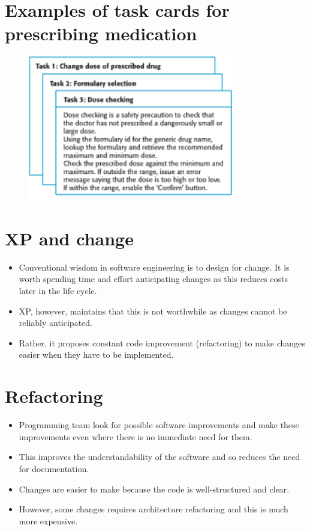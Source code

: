\section{ Examples of task cards for prescribing medication}
\begin{figure}[h!]
    \centering
    \includegraphics[width = 0.8\textwidth]{./figures/L2_5.png}
    \caption{}
    \label{fig:L2_5}
\end{figure}

\section{ XP and change}
\begin{itemize}
\item Conventional wisdom in software engineering is to design for change. It is worth spending time and effort anticipating changes as this reduces costs later in the life cycle.

\item XP, however, maintains that this is not worthwhile as changes cannot be reliably anticipated.
\item Rather, it proposes constant code improvement (refactoring) to make changes easier when they have to be implemented.
\end{itemize}

\section{ Refactoring}
\begin{itemize}

\item Programming team look for possible software improvements and make these improvements even where there is no immediate need for them.

\item This improves the understandability of the software and so reduces the need for documentation.

\item Changes are easier to make because the code is well-structured and clear.

\item However, some changes requires architecture refactoring and this is much more expensive.

\end{itemize}
